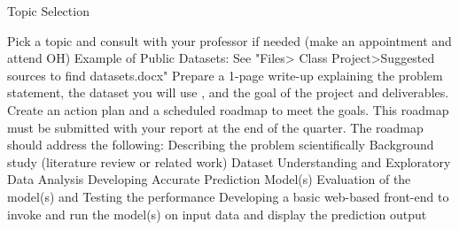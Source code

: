 Topic Selection

Pick a topic and consult with your professor if needed (make an appointment and attend OH)
Example of Public Datasets: See "Files> Class Project>Suggested sources to find datasets.docx"
 Prepare a 1-page write-up explaining the problem statement, the dataset you will use , and the goal of the project and deliverables.
Create an action plan and a scheduled roadmap to meet the goals. This roadmap must be submitted with your report at the end of the quarter. The roadmap should address the following:  
Describing the problem scientifically  
Background study (literature review or related work)  
Dataset Understanding and Exploratory Data Analysis  
Developing Accurate Prediction Model(s)  
Evaluation of the model(s) and Testing the performance  
Developing a basic web-based front-end to invoke and run the model(s) on input data and display the prediction output  